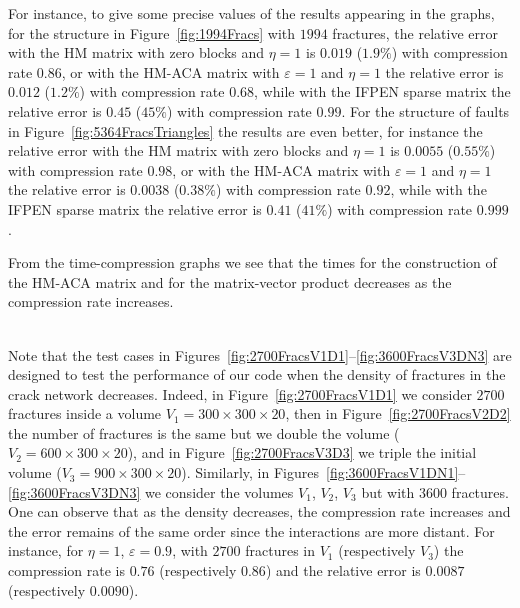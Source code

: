 For instance, to give some precise values of the results appearing in the graphs, for the structure in Figure~\ref{fig:1994Fracs} with $1994$ fractures, the relative error with the HM matrix with zero blocks and $\eta=1$ is $0.019$ ($1.9 \%$) with compression rate $0.86$, or with the HM-ACA matrix with $\varepsilon=1$ and $\eta=1$ the relative error is $0.012$ ($1.2 \%$) with compression rate $0.68$, while with the IFPEN sparse matrix the relative error is $0.45$ ($45 \%$) with compression rate $0.99$.  
For the structure of faults in Figure~\ref{fig:5364FracsTriangles} the results are even better, for instance 
the relative error with the HM matrix with zero blocks and $\eta=1$ is $0.0055$ ($0.55 \%$) with compression rate $0.98$, or with the HM-ACA matrix with $\varepsilon=1$ and $\eta=1$ the relative error is $0.0038$ ($0.38 \%$) with compression rate $0.92$, while with the IFPEN sparse matrix the relative error is $0.41$ ($41 \%$) with compression rate $0.999$.
 
From the time-compression graphs we see that the times for the construction of the HM-ACA matrix and for the matrix-vector product decreases as the compression rate increases.

\quad\\
Note that the test cases in Figures~\ref{fig:2700FracsV1D1}--\ref{fig:3600FracsV3DN3} are designed to test the performance of our code when the density of fractures in the crack network decreases. Indeed, in Figure~\ref{fig:2700FracsV1D1} we consider $2700$ fractures inside a volume $V_1=300\times300\times20$, then in Figure~\ref{fig:2700FracsV2D2} the number of fractures is the same but we double the volume ($V_2=600\times300\times20$), and in Figure~\ref{fig:2700FracsV3D3} we triple the initial volume ($V_3=900\times300\times20$). Similarly, in Figures~\ref{fig:3600FracsV1DN1}--\ref{fig:3600FracsV3DN3} we consider the volumes $V_1$, $V_2$, $V_3$ but with $3600$ fractures. One can observe that as the density decreases, the compression rate increases and the error remains of the same order since the interactions are more distant. For instance, for $\eta=1$, $\varepsilon=0.9$, with $2700$ fractures in $V_1$ (respectively $V_3$) the compression rate is $0.76$ (respectively $0.86$) and the relative error is $0.0087$ (respectively $0.0090$).
   






